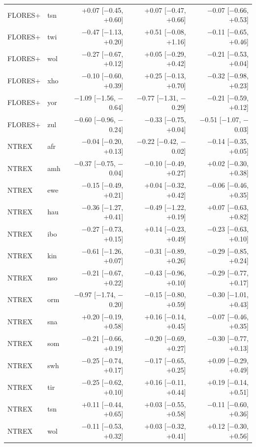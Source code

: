 {\begin{longtable}{@{}llrrr@{}}
FLORES+ & tsn & +0.07 [$-$0.45, +0.60] & +0.07 [$-$0.47, +0.66] & $-$0.07 [$-$0.66, +0.53] \\
FLORES+ & twi & $-$0.47 [$-$1.13, +0.20] & +0.51 [$-$0.08, +1.16] & $-$0.11 [$-$0.65, +0.46] \\
FLORES+ & wol & $-$0.27 [$-$0.67, +0.12] & +0.05 [$-$0.29, +0.42] & $-$0.21 [$-$0.53, +0.04] \\
FLORES+ & xho & $-$0.10 [$-$0.60, +0.39] & +0.25 [$-$0.13, +0.70] & $-$0.32 [$-$0.98, +0.23] \\
FLORES+ & yor & $-$1.09 [$-$1.56, $-$0.64] & $-$0.77 [$-$1.31, $-$0.29] & $-$0.21 [$-$0.59, +0.12] \\
FLORES+ & zul & $-$0.60 [$-$0.96, $-$0.24] & $-$0.33 [$-$0.75, +0.04] & $-$0.51 [$-$1.07, $-$0.03] \\
NTREX & afr & $-$0.04 [$-$0.20, +0.13] & $-$0.22 [$-$0.42, $-$0.02] & $-$0.14 [$-$0.35, +0.05] \\
NTREX & amh & $-$0.37 [$-$0.75, $-$0.04] & $-$0.10 [$-$0.49, +0.27] & +0.02 [$-$0.30, +0.38] \\
NTREX & ewe & $-$0.15 [$-$0.49, +0.21] & +0.04 [$-$0.32, +0.42] & $-$0.06 [$-$0.46, +0.35] \\
NTREX & hau & $-$0.36 [$-$1.27, +0.41] & $-$0.49 [$-$1.22, +0.19] & +0.07 [$-$0.63, +0.82] \\
NTREX & ibo & $-$0.27 [$-$0.73, +0.15] & +0.14 [$-$0.23, +0.49] & $-$0.23 [$-$0.63, +0.10] \\
NTREX & kin & $-$0.61 [$-$1.26, +0.07] & $-$0.31 [$-$0.89, +0.26] & $-$0.29 [$-$0.85, +0.24] \\
NTREX & nso & $-$0.21 [$-$0.67, +0.22] & $-$0.43 [$-$0.96, +0.10] & $-$0.29 [$-$0.77, +0.17] \\
NTREX & orm & $-$0.97 [$-$1.74, $-$0.20] & $-$0.15 [$-$0.80, +0.59] & $-$0.30 [$-$1.01, +0.43] \\
NTREX & sna & +0.20 [$-$0.19, +0.58] & +0.16 [$-$0.14, +0.45] & $-$0.07 [$-$0.46, +0.35] \\
NTREX & som & $-$0.21 [$-$0.66, +0.19] & $-$0.20 [$-$0.69, +0.27] & $-$0.30 [$-$0.77, +0.13] \\
NTREX & swh & $-$0.25 [$-$0.74, +0.17] & $-$0.17 [$-$0.65, +0.25] & +0.09 [$-$0.29, +0.49] \\
NTREX & tir & $-$0.25 [$-$0.62, +0.10] & +0.16 [$-$0.11, +0.44] & +0.19 [$-$0.14, +0.51] \\
NTREX & tsn & +0.11 [$-$0.44, +0.65] & +0.03 [$-$0.55, +0.58] & $-$0.11 [$-$0.60, +0.36] \\
NTREX & wol & $-$0.11 [$-$0.53, +0.32] & +0.03 [$-$0.32, +0.41] & +0.12 [$-$0.30, +0.56] \\

\end{longtable}}
